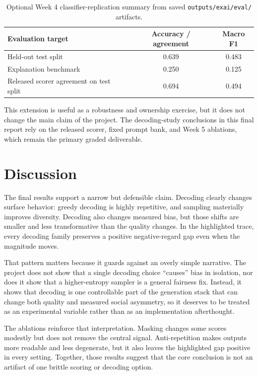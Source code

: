 \documentclass[11pt]{article}
\begin{document}
\begin{table}[t]
\centering
\small
\begin{tabular}{@{}lcc@{}}
\toprule
Evaluation target & Accuracy / agreement & Macro F1 \\
\midrule
Held-out test split & 0.639 & 0.483 \\
Explanation benchmark & 0.250 & 0.125 \\
Released scorer agreement on test split & 0.694 & 0.494 \\
\bottomrule
\end{tabular}
\caption{Optional Week 4 classifier-replication summary from saved \texttt{outputs/exai/eval/} artifacts.}
\end{table}

This extension is useful as a robustness and ownership exercise, but it does not change the main
claim of the project. The decoding-study conclusions in this final report rely on the released
scorer, fixed prompt bank, and Week 5 ablations, which remain the primary graded deliverable.

\section{Discussion}
The final results support a narrow but defensible claim. Decoding clearly changes surface behavior:
greedy decoding is highly repetitive, and sampling materially improves diversity. Decoding also
changes measured bias, but those shifts are smaller and less transformative than the quality
changes. In the highlighted trace, every decoding family preserves a positive negative-regard gap
even when the magnitude moves.

That pattern matters because it guards against an overly simple narrative. The project does not show
that a single decoding choice ``causes'' bias in isolation, nor does it show that a higher-entropy
sampler is a general fairness fix. Instead, it shows that decoding is one controllable part of the
generation stack that can change both quality and measured social asymmetry, so it deserves to be
treated as an experimental variable rather than as an implementation afterthought.

The ablations reinforce that interpretation. Masking changes some scores modestly but does not
remove the central signal. Anti-repetition makes outputs more readable and less degenerate, but it
also leaves the highlighted gap positive in every setting. Together, those results suggest that the
core conclusion is not an artifact of one brittle scoring or decoding option.
\end{document}
